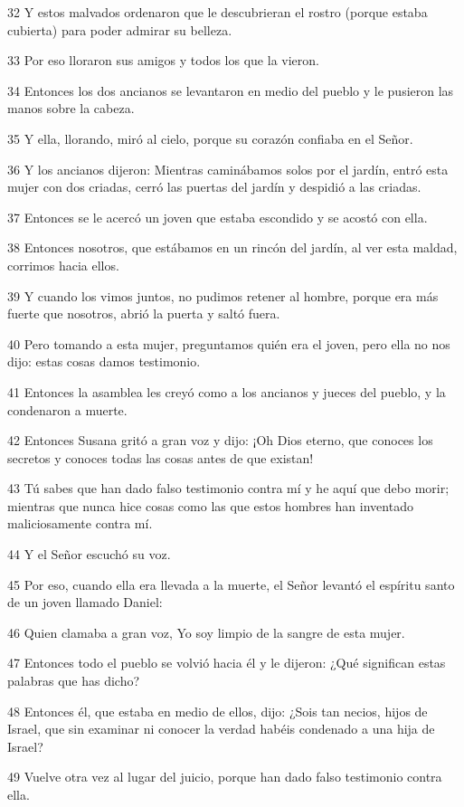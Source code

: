\par 32 Y estos malvados ordenaron que le descubrieran el rostro (porque estaba cubierta) para poder admirar su belleza.
\par 33 Por eso lloraron sus amigos y todos los que la vieron.
\par 34 Entonces los dos ancianos se levantaron en medio del pueblo y le pusieron las manos sobre la cabeza.
\par 35 Y ella, llorando, miró al cielo, porque su corazón confiaba en el Señor.
\par 36 Y los ancianos dijeron: Mientras caminábamos solos por el jardín, entró esta mujer con dos criadas, cerró las puertas del jardín y despidió a las criadas.
\par 37 Entonces se le acercó un joven que estaba escondido y se acostó con ella.
\par 38 Entonces nosotros, que estábamos en un rincón del jardín, al ver esta maldad, corrimos hacia ellos.
\par 39 Y cuando los vimos juntos, no pudimos retener al hombre, porque era más fuerte que nosotros, abrió la puerta y saltó fuera.
\par 40 Pero tomando a esta mujer, preguntamos quién era el joven, pero ella no nos dijo: estas cosas damos testimonio.
\par 41 Entonces la asamblea les creyó como a los ancianos y jueces del pueblo, y la condenaron a muerte.
\par 42 Entonces Susana gritó a gran voz y dijo: ¡Oh Dios eterno, que conoces los secretos y conoces todas las cosas antes de que existan!
\par 43 Tú sabes que han dado falso testimonio contra mí y he aquí que debo morir; mientras que nunca hice cosas como las que estos hombres han inventado maliciosamente contra mí.
\par 44 Y el Señor escuchó su voz.
\par 45 Por eso, cuando ella era llevada a la muerte, el Señor levantó el espíritu santo de un joven llamado Daniel:
\par 46 Quien clamaba a gran voz, Yo soy limpio de la sangre de esta mujer.
\par 47 Entonces todo el pueblo se volvió hacia él y le dijeron: ¿Qué significan estas palabras que has dicho?
\par 48 Entonces él, que estaba en medio de ellos, dijo: ¿Sois tan necios, hijos de Israel, que sin examinar ni conocer la verdad habéis condenado a una hija de Israel?
\par 49 Vuelve otra vez al lugar del juicio, porque han dado falso testimonio contra ella.
